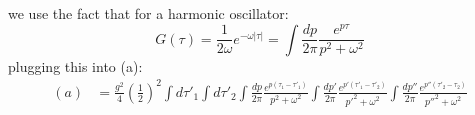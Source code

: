 \documentclass{article}
\begin{document}
we use the fact that for a harmonic oscillator:
\begin{equation}
    G(\tau)=\frac{1}{2\omega}e^{-\omega|\tau|}=\int \frac{dp}{2\pi}\frac{e^{p\tau}}{p^2+\omega^2}
\end{equation}
plugging this into (a):
\begin{equation*}
\begin{split}
    (a) &=  \frac{g^2}{4}(\frac{1}{2})^2\int d\tau'_1\int d\tau'_2 \int \frac{dp}{2\pi}\frac{e^{p(\tau_1-\tau'_1)}}{p^2+\omega^2}\int \frac{dp'}{2\pi}\frac{e^{p'(\tau'_1-\tau'_2)}}{p'^2+\omega^2}\int \frac{dp''}{2\pi}\frac{e^{p''(\tau'_2-\tau_2)}}{p''^2+\omega^2}
\end{split}
\end{equation*}
\end{document}
